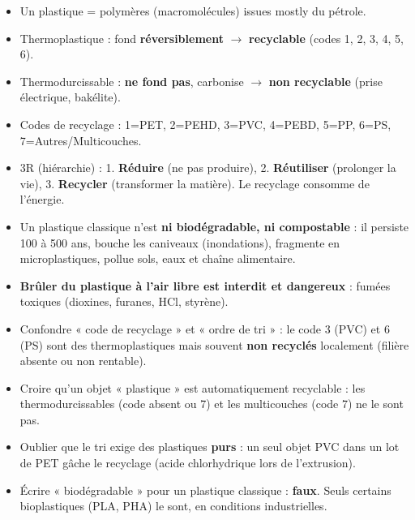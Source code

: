 \documentclass[11pt]{article}
\newcommand{\cle}[1]{{\popxbold\color{popdark}#1}}
\begin{document}
\begin{aretenir}
\begin{itemize}
\item Un \cle{plastique} = polymères (macromolécules) issues mostly du pétrole.
\item \cle{Thermoplastique} : fond \textbf{réversiblement} $\rightarrow$ \textbf{recyclable} (codes 1, 2, 3, 4, 5, 6).
\item \cle{Thermodurcissable} : \textbf{ne fond pas}, carbonise $\rightarrow$ \textbf{non recyclable} (prise électrique, bakélite).
\item \cle{Codes de recyclage} : 1=PET, 2=PEHD, 3=PVC, 4=PEBD, 5=PP, 6=PS, 7=Autres/Multicouches.
\item \cle{3R} (hiérarchie) : 1. \textbf{Réduire} (ne pas produire), 2. \textbf{Réutiliser} (prolonger la vie), 3. \textbf{Recycler} (transformer la matière). Le recyclage consomme de l'énergie.
\item Un plastique classique n'est \textbf{ni biodégradable, ni compostable} : il persiste \num{100} à \num{500} ans, bouche les caniveaux (inondations), fragmente en microplastiques, pollue sols, eaux et chaîne alimentaire.
\item \textbf{Brûler du plastique à l'air libre est interdit et dangereux} : fumées toxiques (dioxines, furanes, HCl, styrène).
\end{itemize}
\end{aretenir}

\begin{attention}
\begin{itemize}
\item Confondre « code de recyclage » et « ordre de tri » : le code 3 (PVC) et 6 (PS) sont des thermoplastiques mais souvent \textbf{non recyclés} localement (filière absente ou non rentable).
\item Croire qu'un objet « plastique » est automatiquement recyclable : les thermodurcissables (code absent ou 7) et les multicouches (code 7) ne le sont pas.
\item Oublier que le tri exige des plastiques \textbf{purs} : un seul objet PVC dans un lot de PET gâche le recyclage (acide chlorhydrique lors de l'extrusion).
\item Écrire « biodégradable » pour un plastique classique : \textbf{faux}. Seuls certains bioplastiques (PLA, PHA) le sont, en conditions industrielles.
\end{itemize}
\end{attention}
\end{document}
